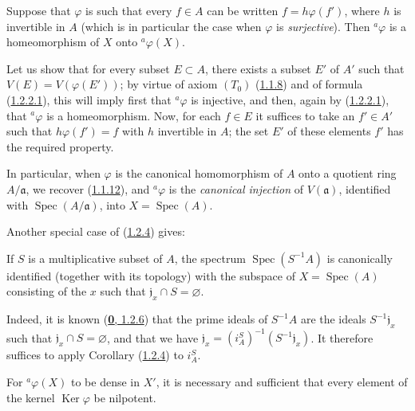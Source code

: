 \begin{corollary}[1.2.4]
\label{I.1.2.4}
Suppose that $\varphi$ is such that every $f\in A$ can be written
$f=h\varphi(f')$, where $h$ is invertible in $A$ \textup{(which is in particular
the case when $\varphi$ is \emph{surjective})}. Then ${}^a\varphi$ is a
homeomorphism of $X$ onto ${}^a\varphi(X)$.
\end{corollary}

Let us show that for every subset $E\subset A$, there exists a subset $E'$
of $A'$ such that $V(E)=V(\varphi(E'))$; by virtue of axiom $(T_0)$
(\hyperref[I.1.1.8]{1.1.8}) and of formula
(\hyperref[I.1.2.2.1]{1.2.2.1}), this will imply first that
${}^a\varphi$ is injective, and then, again by
(\hyperref[I.1.2.2.1]{1.2.2.1}), that ${}^a\varphi$ is a
homeomorphism. Now, for each $f\in E$ it suffices to take an $f'\in A'$
such that $h\varphi(f')=f$ with $h$ invertible in $A$; the set $E'$ of these
elements $f'$ has the required property.

\begin{env}[1.2.5]
\label{I.1.2.5}
In particular, when $\varphi$ is the canonical homomorphism of $A$ onto a
quotient ring $A/\mathfrak{a}$, we recover
(\hyperref[I.1.1.12]{1.1.12}), and ${}^a\varphi$ is the \emph{canonical
injection} of $V(\mathfrak{a})$, identified with
$\operatorname{Spec}(A/\mathfrak{a})$, into $X=\operatorname{Spec}(A)$.
\end{env}

Another special case of (\hyperref[I.1.2.4]{1.2.4}) gives:

\begin{corollary}[1.2.6]
\label{I.1.2.6}
If $S$ is a multiplicative subset of $A$, the spectrum
$\operatorname{Spec}(S^{-1}A)$ is canonically identified (together with its
topology) with the subspace of $X=\operatorname{Spec}(A)$ consisting of the
$x$ such that $\mathfrak{j}_x\cap S=\varnothing$.
\end{corollary}

Indeed, it is known (\hyperref[0.1.2.6]{\textbf{0}, 1.2.6}) that the prime ideals
of $S^{-1}A$ are the ideals $S^{-1}\mathfrak{j}_x$ such that
$\mathfrak{j}_x\cap S=\varnothing$, and that we have
$\mathfrak{j}_x=(i_A^S)^{-1}(S^{-1}\mathfrak{j}_x)$. It therefore
suffices to apply Corollary (\hyperref[I.1.2.4]{1.2.4}) to $i_A^S$.

\begin{corollary}[1.2.7]
\label{I.1.2.7}
For ${}^a\varphi(X)$ to be dense in $X'$, it is necessary and sufficient
that every element of the kernel $\operatorname{Ker}\varphi$ be nilpotent.
\end{corollary}

